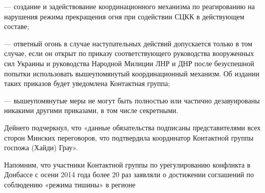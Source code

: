 — создание и задействование координационного механизма по реагированию на
нарушения режима прекращения огня при содействии СЦКК в действующем составе;

— ответный огонь в случае наступательных действий допускается только в том
случае, если он открыт по приказу соответствующего руководства вооруженных сил
Украины и руководства Народной Милиции ЛНР и ДНР после безуспешной попытки
использовать вышеупомянутый координационный механизм. Об издании таких приказов
будет уведомлена Контактная группа;

— вышеупомянутые меры не могут быть полностью или частично дезавуированы
никакими другими приказами, в том числе секретными.

Дейнего подчеркнул, что «данные обязательства подписаны представителями всех
сторон Минских переговоров, что подтвердила координатор Контактной группы
госпожа (Хайди) Грау».

Напомним, что участники Контактной группы по урегулированию конфликта в
Донбассе с осени 2014 года более 20 раз заявляли о достижении соглашений по
соблюдению «режима тишины» в регионе

